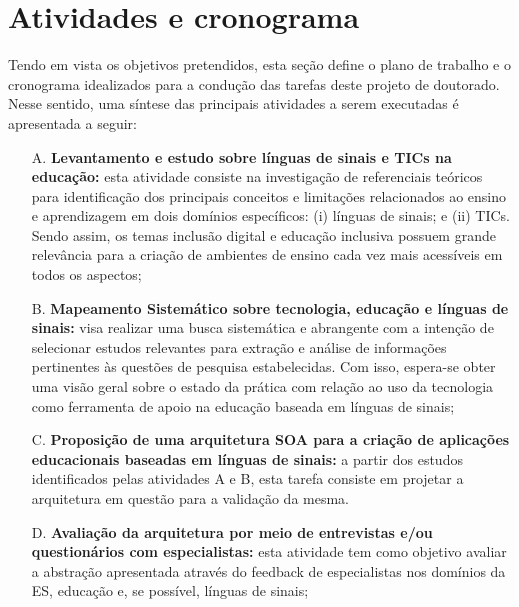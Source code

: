 \section{Atividades e cronograma}

Tendo em vista os objetivos pretendidos, esta seção define o plano de trabalho e o cronograma idealizados para a condução das tarefas deste projeto de doutorado. Nesse sentido, uma síntese das principais atividades a serem executadas é apresentada a seguir:

\begin{enumerate}
    \item [A.]\textbf{Levantamento e estudo sobre línguas de sinais e TICs na educação:} esta atividade consiste na investigação de referenciais teóricos para identificação dos principais conceitos e limitações relacionados ao ensino e aprendizagem em dois domínios específicos: (i) línguas de sinais; e (ii) TICs. Sendo assim, os temas inclusão digital e educação inclusiva possuem grande relevância para a criação de ambientes de ensino cada vez mais acessíveis em todos os aspectos;
    
    \item [B.]\textbf{Mapeamento Sistemático sobre tecnologia, educação e línguas de sinais:} visa realizar uma busca sistemática e abrangente com a intenção de selecionar estudos relevantes para extração e análise de informações pertinentes às questões de pesquisa estabelecidas. Com isso, espera-se obter uma visão geral sobre o estado da prática com relação ao uso da tecnologia como ferramenta de apoio na educação baseada em línguas de sinais;
    
    \item [C.]\textbf{Proposição de uma arquitetura SOA para a criação de aplicações educacionais baseadas em línguas de sinais:} a partir dos estudos identificados pelas atividades A e B, esta tarefa consiste em projetar a arquitetura em questão para a validação da mesma.%
    
    \item [D.]\textbf{Avaliação da arquitetura por meio de entrevistas e/ou questionários com especialistas:} esta atividade tem como objetivo avaliar a abstração apresentada através do feedback de especialistas nos domínios da ES, educação e, se possível, línguas de sinais;
    

\end{enumerate}
